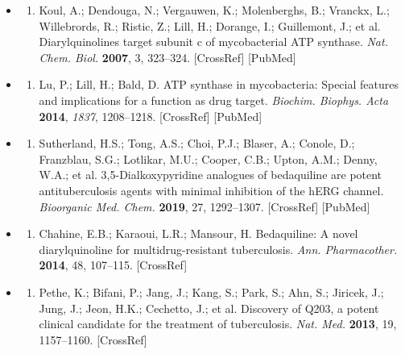 \documentclass{article}
\begin{document}
\begin{itemize}
\begin{enumerate}
\end{enumerate}

\item \begin{enumerate}
\item 
Koul, A.; Dendouga, N.; Vergauwen, K.; Molenberghs, B.; Vranckx, L.; Willebrords, R.; Ristic, Z.; Lill, H.; Dorange, I.; Guillemont, J.; et al. Diarylquinolines target subunit c of mycobacterial ATP synthase. \textit{Nat. Chem. Biol.} \textbf{2007}, 3, 323–324. [CrossRef] [PubMed]

\end{enumerate}

\item \begin{enumerate}
\item 
Lu, P.; Lill, H.; Bald, D. ATP synthase in mycobacteria: Special features and implications for a function as drug target. \textit{Biochim. Biophys. Acta} \textbf{2014}, \textit{1837}, 1208–1218. [CrossRef] [PubMed]

\end{enumerate}

\item \begin{enumerate}
\item 
Sutherland, H.S.; Tong, A.S.; Choi, P.J.; Blaser, A.; Conole, D.; Franzblau, S.G.; Lotlikar, M.U.; Cooper, C.B.; Upton, A.M.; Denny, W.A.; et al. 3,5-Dialkoxypyridine analogues of bedaquiline are potent antituberculosis agents with minimal inhibition of the hERG channel. \textit{Bioorganic Med. Chem.} \textbf{2019}, 27, 1292–1307. [CrossRef] [PubMed]

\end{enumerate}

\item \begin{enumerate}
\item 
Chahine, E.B.; Karaoui, L.R.; Mansour, H. Bedaquiline: A novel diarylquinoline for multidrug-resistant tuberculosis. \textit{Ann. Pharmacother.} \textbf{2014}, 48, 107–115. [CrossRef]

\end{enumerate}

\item \begin{enumerate}
\item 
Pethe, K.; Bifani, P.; Jang, J.; Kang, S.; Park, S.; Ahn, S.; Jiricek, J.; Jung, J.; Jeon, H.K.; Cechetto, J.; et al. Discovery of Q203, a potent clinical candidate for the treatment of tuberculosis. \textit{Nat. Med.} \textbf{2013}, 19, 1157–1160. [CrossRef]


\end{enumerate}
\end{itemize}
\end{document}
